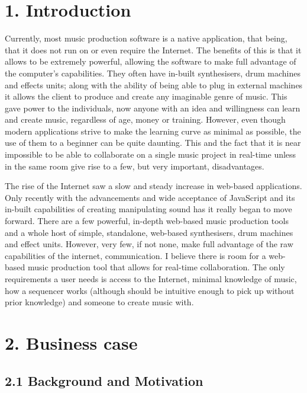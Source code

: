 \documentclass[a4paper]{article}
\begin{document}
\justify

\section{1. Introduction}

Currently, most music production software is a native application, that being, that it does not run on or even require the Internet. The benefits of this is that it allows to be extremely powerful, allowing the software to make full advantage of the computer's capabilities. They often have in-built synthesisers, drum machines and effects units; along with the ability of being able to plug in external machines it allows the client to produce and create any imaginable genre of music. This gave power to the individuals, now anyone with an idea and willingness can learn and create music, regardless of age, money or training. However, even though modern applications strive to make the learning curve as minimal as possible, the use of them to a beginner can be quite daunting. This and the fact that it is near impossible to be able to collaborate on a single music project in real-time unless in the same room give rise to a few, but very important, disadvantages. \par

The rise of the Internet saw a slow and steady increase in web-based applications. Only recently with the advancements and wide acceptance of JavaScript and its in-built capabilities of creating manipulating sound has it really began to move forward. There are a few powerful, in-depth web-based music production tools and a whole host of simple, standalone, web-based synthesisers, drum machines and effect units. However, very few, if not none, make full advantage of the raw capabilities of the internet, communication. I believe there is room for a web-based music production tool that allows for real-time collaboration. The only requirements a user needs is access to the Internet, minimal knowledge of music, how a sequencer works (although should be intuitive enough to pick up without prior knowledge) and someone to create music with. \par

\section{2. Business case}

\subsection{2.1 Background and Motivation}
\end{document}
